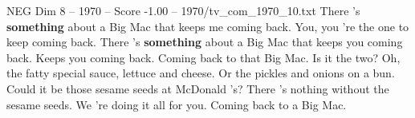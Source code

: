 \begin{textsample}{NEG Dim 8 – 1970 – Score -1.00 – 1970/tv\_com\_1970\_10.txt}  \label{ex:f8_neg_017}
There 's \textbf{something} about a Big Mac that keeps me coming back.
You, you 're the one to keep coming back.
There 's \textbf{something} about a Big Mac that keeps you coming back.
Keeps you coming back.
Coming back to that Big Mac.
Is it the two?
Oh, the fatty special sauce, lettuce and cheese.
Or the pickles and onions on a bun.
Could it be those sesame seeds at McDonald 's?
There 's nothing without the sesame seeds.
We 're doing it all for you.
Coming back to a Big Mac.

\end{textsample}
